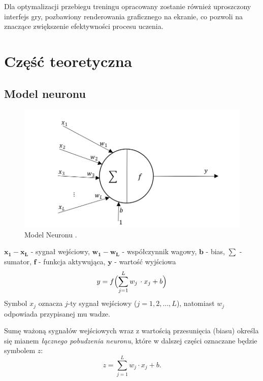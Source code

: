 \documentclass[a4paper,12pt]{article}
\begin{document}
Dla optymalizacji przebiegu treningu opracowany zostanie również uproszczony interfejs gry, pozbawiony renderowania graficznego na ekranie, co pozwoli na znaczące zwiększenie efektywności procesu uczenia.
\clearpage  
\section{Część teoretyczna}
\subsection{Model neuronu}
\begin{figure}[h!]
    \centering
    \includegraphics[width=1\linewidth]{image.png}
    \caption{Model Neuronu \cite{RZajdelNeuron}.}
\end{figure}

\noindent $\boldsymbol{x_1 - x_L}$ - sygnał wejściowy, \newline
 $\boldsymbol{w_1 - w_L}$ - współczynnik wagowy, \newline
$\boldsymbol{b}$ - bias, \newline
$\boldsymbol{\sum}$  - sumator, \newline
$\boldsymbol{f}$ - funkcja aktywująca, \newline
$\boldsymbol{y}$ - wartość wyjściowa 
\begin{equation}
y = f\Bigl(\sum_{j=1}^{L} w_j\,\cdot x_j + b\Bigr)
\end{equation}
Symbol \(x_j\) oznacza \(j\)-ty sygnał wejściowy (\(j = 1, 2, \dots, L\)), natomiast \(w_j\) odpowiada przypisanej mu wadze.

\medskip

Sumę ważoną sygnałów wejściowych wraz z wartością przesunięcia (biasu) określa się mianem \textit{łącznego pobudzenia neuronu}, które w dalszej części oznaczane będzie symbolem \(z\):
\begin{equation}
z = \sum_{j=1}^{L} w_j \cdot x_j + b.
\end{equation}
\end{document}
